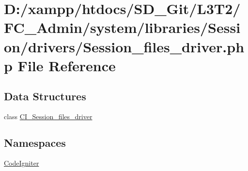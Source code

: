 \hypertarget{_admin_2system_2libraries_2_session_2drivers_2_session__files__driver_8php}{}\section{D\+:/xampp/htdocs/\+S\+D\+\_\+\+Git/\+L3\+T2/\+F\+C\+\_\+\+Admin/system/libraries/\+Session/drivers/\+Session\+\_\+files\+\_\+driver.php File Reference}
\label{_admin_2system_2libraries_2_session_2drivers_2_session__files__driver_8php}
\subsection*{Data Structures}
\begin{DoxyCompactItemize}
\item 
class \hyperlink{class_c_i___session__files__driver}{C\+I\+\_\+\+Session\+\_\+files\+\_\+driver}
\end{DoxyCompactItemize}
\subsection*{Namespaces}
\begin{DoxyCompactItemize}
\item 
 \hyperlink{namespace_code_igniter}{Code\+Igniter}
\end{DoxyCompactItemize}
